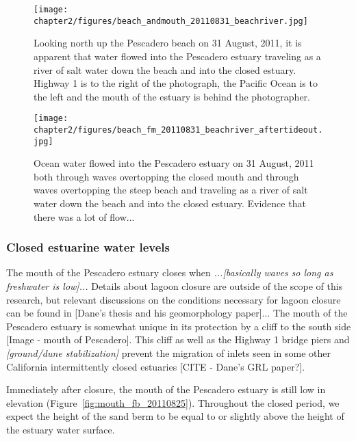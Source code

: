 \begin{figure}
	\begin{center}
		\texttt{[image: chapter2/figures/beach\_andmouth\_20110831\_beachriver.jpg]} \caption{Looking north up the Pescadero beach on 31 August, 2011, it is apparent that water flowed into the Pescadero estuary traveling as a river of salt water down the beach and into the closed estuary. Highway 1 is to the right of the photograph, the Pacific Ocean is to the left and the mouth of the estuary is behind the photographer.}
	\end{center}
\label{fig:beachriver} \end{figure}

\begin{figure}
	\begin{center}
		\texttt{[image: chapter2/figures/beach\_fm\_20110831\_beachriver\_aftertideout.jpg]} \caption{Ocean water flowed into the Pescadero estuary on 31 August, 2011 both through waves overtopping the closed mouth and through waves overtopping the steep beach and traveling as a river of salt water down the beach and into the closed estuary. Evidence that there was a lot of flow...}
	\end{center}
\label{fig:beachriver_after} \end{figure}

\subsubsection{Closed estuarine water levels} \label{cl_wl}
The mouth of the Pescadero estuary closes when \emph{...[basically waves
so long as freshwater is low]...} Details about lagoon closure are
outside of the scope of this research, but relevant discussions on the
conditions necessary for lagoon closure can be found in [Dane's thesis
and his geomorphology paper]... The mouth of the Pescadero estuary is
somewhat unique in its protection by a cliff to the south side [Image -
mouth of Pescadero]. This cliff as well as the Highway 1 bridge piers
and \emph{[ground/dune stabilization]} prevent the migration of inlets
seen in some other California intermittently closed estuaries [CITE -
Dane's GRL paper?].

Immediately after closure, the mouth of the Pescadero estuary is still
low in elevation (Figure~\ref{fig:mouth_fb_20110825}). Throughout the closed period, we
expect the height of the sand berm to be equal to or slightly above the
height of the estuary water surface.

